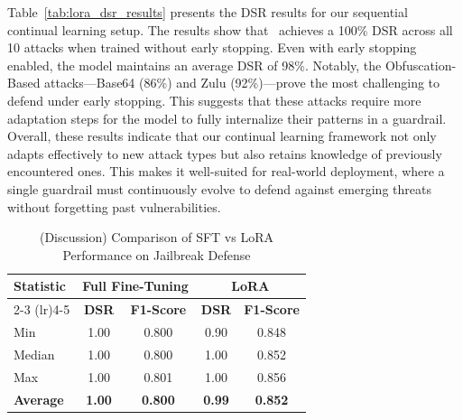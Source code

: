 Table~\ref{tab:lora_dsr_results} presents the DSR results for our sequential continual learning setup. The results show that \ourapp~achieves a 100\% DSR across all 10 attacks when trained without early stopping. Even with early stopping enabled, the model maintains an average DSR of 98\%.
Notably, the Obfuscation-Based attacks—Base64 (86\%) and Zulu (92\%)—prove the most challenging to defend under early stopping. This suggests that these attacks require more adaptation steps for the model to fully internalize their patterns in a guardrail.
Overall, these results indicate that our continual learning framework not only adapts effectively to new attack types but also retains knowledge of previously encountered ones. This makes it well-suited for real-world deployment, where a single guardrail must continuously evolve to defend against emerging threats without forgetting past vulnerabilities.

\begin{table}[htbp]
\centering
\caption{(Discussion) Comparison of SFT vs LoRA Performance on Jailbreak Defense}
\label{tab:sft_lora_comparison}
\begin{tabular}{lcccc}
\toprule
\multirow{2}{*}{\textbf{Statistic}} & \multicolumn{2}{c}{\textbf{Full Fine-Tuning}} & \multicolumn{2}{c}{\textbf{LoRA}} \\
\cmidrule(lr){2-3} \cmidrule(lr){4-5}
& \textbf{DSR} & \textbf{F1-Score} & \textbf{DSR} & \textbf{F1-Score} \\
\midrule
Min & 1.00 & 0.800 & 0.90 & 0.848 \\
Median & 1.00 & 0.800 & 1.00 & 0.852 \\
Max & 1.00 & 0.801 & 1.00 & 0.856 \\
\midrule
\textbf{Average} & \textbf{1.00} & \textbf{0.800} & \textbf{0.99} & \textbf{0.852} \\
\bottomrule

\end{tabular}
\end{table}


